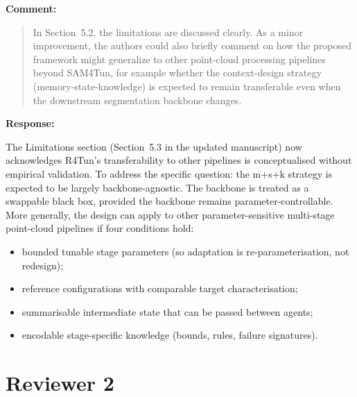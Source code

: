 \documentclass[11pt,a4paper]{article}
\newenvironment{commentblock}{%
  \par\smallskip\noindent\textbf{Comment:}\par
  \begin{quote}\itshape\color{black}
}{%
  \end{quote}\smallskip
}
\newenvironment{responseblock}{%
  \par\smallskip\noindent\textbf{Response:}\par
  \begingroup\color{responsegreen}
}{%
  \endgroup\smallskip
}
\begin{document}
\begin{commentblock}
In Section~5.2, the limitations are discussed clearly. As a minor improvement, the authors could also briefly comment on how the proposed framework might generalize to other point-cloud processing pipelines beyond SAM4Tun, for example whether the context-design strategy (memory-state-knowledge) is expected to remain transferable even when the downstream segmentation backbone changes.
\end{commentblock}
\begin{responseblock}
The Limitations section (Section~5.3 in the updated manuscript) now acknowledges R4Tun's transferability to other pipelines is conceptualised without empirical validation. To address the specific question: the m+s+k strategy is expected to be largely backbone-agnostic. The backbone is treated as a swappable black box, provided the backbone remains parameter-controllable.
More generally, the design can apply to other parameter-sensitive multi-stage point-cloud pipelines if four conditions hold:
\begin{itemize}[nosep]
  \item bounded tunable stage parameters (so adaptation is re-parameterisation, not redesign);
  \item reference configurations with comparable target characterisation;
  \item summarisable intermediate state that can be passed between agents;
  \item encodable stage-specific knowledge (bounds, rules, failure signatures).
\end{itemize}
\end{responseblock}

\section*{Reviewer 2}
\end{document}
